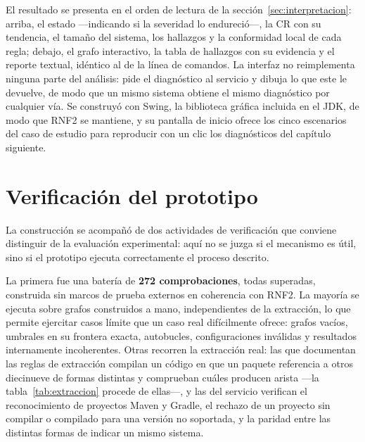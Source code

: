 El resultado se presenta en el orden de lectura de la sección~\ref{sec:interpretacion}: arriba, el estado ---indicando si la severidad lo endureció---, la CR con su tendencia, el tamaño del sistema, los hallazgos y la conformidad local de cada regla; debajo, el grafo interactivo, la tabla de hallazgos con su evidencia y el reporte textual, idéntico al de la línea de comandos. La interfaz no reimplementa ninguna parte del análisis: pide el diagnóstico al servicio y dibuja lo que este le devuelve, de modo que un mismo sistema obtiene el mismo diagnóstico por cualquier vía. Se construyó con Swing, la biblioteca gráfica incluida en el JDK, de modo que RNF2 se mantiene, y su pantalla de inicio ofrece los cinco escenarios del caso de estudio para reproducir con un clic los diagnósticos del capítulo siguiente.

\section{Verificación del prototipo}
\label{sec:verificacion}
La construcción se acompañó de dos actividades de verificación que conviene distinguir de la evaluación experimental: aquí no se juzga si el mecanismo es útil, sino si el prototipo ejecuta correctamente el proceso descrito.

La primera fue una batería de \textbf{272 comprobaciones}, todas superadas, construida sin marcos de prueba externos en coherencia con RNF2. La mayoría se ejecuta sobre grafos construidos a mano, independientes de la extracción, lo que permite ejercitar casos límite que un caso real difícilmente ofrece: grafos vacíos, umbrales en su frontera exacta, autobucles, configuraciones inválidas y resultados internamente incoherentes. Otras recorren la extracción real: las que documentan las reglas de extracción compilan un código en que un paquete referencia a otros diecinueve de formas distintas y comprueban cuáles producen arista ---la tabla~\ref{tab:extraccion} procede de ellas---, y las del servicio verifican el reconocimiento de proyectos Maven y Gradle, el rechazo de un proyecto sin compilar o compilado para una versión no soportada, y la paridad entre las distintas formas de indicar un mismo sistema.

